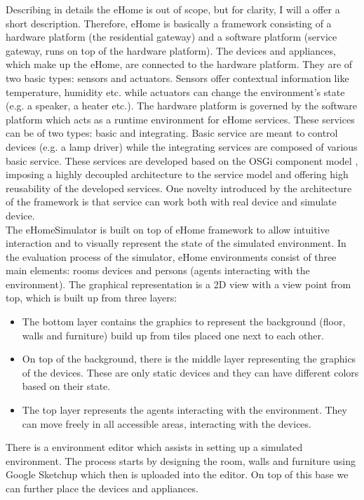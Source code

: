 Describing in details the eHome is out of scope, but for clarity, I will a offer a short description. Therefore, eHome is basically a framework consisting of a hardware platform (the residential gateway) and a software platform (service gateway, runs on top of the hardware platform). The devices and appliances, which make up the eHome, are connected to the hardware platform. They are of two basic types: sensors and actuators. Sensors offer contextual information like temperature, humidity etc. while actuators can change the environment's state (e.g. a speaker, a heater etc.). The hardware platform is governed by the software platform which acts as a runtime environment for eHome services. These services can be of two types: basic and integrating. Basic service are meant to control devices (e.g. a lamp driver) while the integrating services are composed of various basic service. These services are developed based on the OSGi component model \cite{allianceosgi}, imposing a highly decoupled architecture to the service model and offering high reusability of the developed services. One novelty introduced by the architecture of the framework is that service can work both with real device and simulate device.\\

The eHomeSimulator is built on top of eHome framework to allow intuitive interaction and to visually represent the state of the simulated environment. In the evaluation process of the simulator, eHome environments consist of three main elements: rooms devices and persons (agents interacting with the environment). The graphical representation is a 2D view with a view point from top, which is built up from three layers:
\begin{itemize}
	\item The bottom layer contains the graphics to represent the background (floor, walls and furniture) build up from tiles placed one next to each other.
	\item On top of the background, there is the middle layer representing the graphics of the devices. These are only static devices and they can have different colors based on their state.
	\item The top layer represents the agents interacting with the environment. They can move freely in all accessible areas, interacting with the devices.
\end{itemize}

There is a environment editor which assists in setting up a simulated environment. The process starts by designing the room, walls and furniture using Google Sketchup \cite{sketchup:online} which then is uploaded into the editor. On top of this base we can further place the devices and appliances.\\

